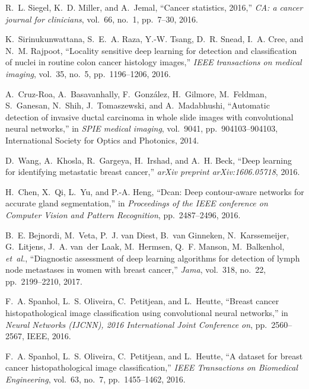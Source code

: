 \documentclass[runningheads,a4paper]{llncs}
\begin{document}
\begin{thebibliography}{10}

R.~L. Siegel, K.~D. Miller, and A.~Jemal, ``Cancer statistics, 2016,'' {\em CA:
  a cancer journal for clinicians}, vol.~66, no.~1, pp.~7--30, 2016.

K.~Sirinukunwattana, S.~E.~A. Raza, Y.-W. Tsang, D.~R. Snead, I.~A. Cree, and
  N.~M. Rajpoot, ``Locality sensitive deep learning for detection and
  classification of nuclei in routine colon cancer histology images,'' {\em
  IEEE transactions on medical imaging}, vol.~35, no.~5, pp.~1196--1206, 2016.

A.~Cruz-Roa, A.~Basavanhally, F.~Gonz{\'a}lez, H.~Gilmore, M.~Feldman,
  S.~Ganesan, N.~Shih, J.~Tomaszewski, and A.~Madabhushi, ``Automatic detection
  of invasive ductal carcinoma in whole slide images with convolutional neural
  networks,'' in {\em SPIE medical imaging}, vol.~9041, pp.~904103--904103,
  International Society for Optics and Photonics, 2014.

D.~Wang, A.~Khosla, R.~Gargeya, H.~Irshad, and A.~H. Beck, ``Deep learning for
  identifying metastatic breast cancer,'' {\em arXiv preprint
  arXiv:1606.05718}, 2016.

H.~Chen, X.~Qi, L.~Yu, and P.-A. Heng, ``Dcan: Deep contour-aware networks for
  accurate gland segmentation,'' in {\em Proceedings of the IEEE conference on
  Computer Vision and Pattern Recognition}, pp.~2487--2496, 2016.

B.~E. Bejnordi, M.~Veta, P.~J. van Diest, B.~van Ginneken, N.~Karssemeijer,
  G.~Litjens, J.~A. van~der Laak, M.~Hermsen, Q.~F. Manson, M.~Balkenhol, {\em
  et~al.}, ``Diagnostic assessment of deep learning algorithms for detection of
  lymph node metastases in women with breast cancer,'' {\em Jama}, vol.~318,
  no.~22, pp.~2199--2210, 2017.

F.~A. Spanhol, L.~S. Oliveira, C.~Petitjean, and L.~Heutte, ``Breast cancer
  histopathological image classification using convolutional neural networks,''
  in {\em Neural Networks (IJCNN), 2016 International Joint Conference on},
  pp.~2560--2567, IEEE, 2016.

F.~A. Spanhol, L.~S. Oliveira, C.~Petitjean, and L.~Heutte, ``A dataset for
  breast cancer histopathological image classification,'' {\em IEEE
  Transactions on Biomedical Engineering}, vol.~63, no.~7, pp.~1455--1462,
  2016.


\end{thebibliography}
\end{document}
